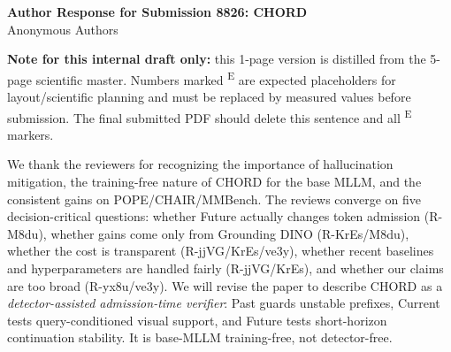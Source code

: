\documentclass[9pt]{extarticle}
\newcommand{\E}{\textsuperscript{E}}
\newcommand{\head}[1]{\vspace{2pt}\noindent{\bfseries #1.}}
\begin{document}
\begin{center}
{\large \bfseries Author Response for Submission 8826: CHORD}\\[-1pt]
{\small Anonymous Authors}
\end{center}
\vspace{-0.55em}

\textbf{Note for this internal draft only:} this 1-page version is distilled from the 5-page scientific master. Numbers marked \E{} are expected placeholders for layout/scientific planning and must be replaced by measured values before submission. The final submitted PDF should delete this sentence and all \E{} markers.

\head{Response focus}
We thank the reviewers for recognizing the importance of hallucination mitigation, the training-free nature of CHORD for the base MLLM, and the consistent gains on POPE/CHAIR/MMBench. The reviews converge on five decision-critical questions: whether Future actually changes token admission (R-M8du), whether gains come only from Grounding DINO (R-KrEs/M8du), whether the cost is transparent (R-jjVG/KrEs/ve3y), whether recent baselines and hyperparameters are handled fairly (R-jjVG/KrEs), and whether our claims are too broad (R-yx8u/ve3y). We will revise the paper to describe CHORD as a \emph{detector-assisted admission-time verifier}: Past guards unstable prefixes, Current tests query-conditioned visual support, and Future tests short-horizon continuation stability. It is base-MLLM training-free, not detector-free.
\end{document}
